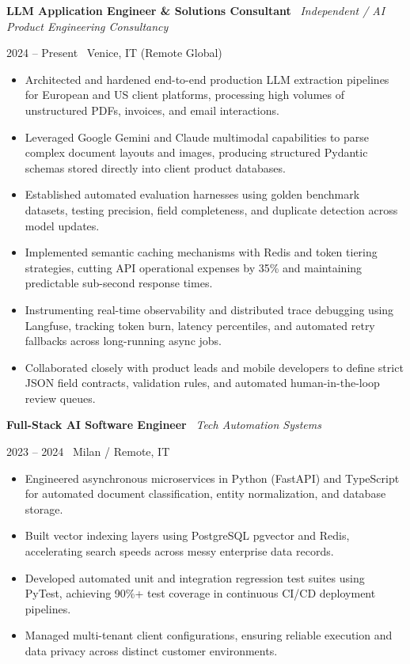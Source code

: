 \documentclass[a4paper,10pt]{article}
\newcommand{\role}[4]{%
  \vspace{2pt}\noindent
  \begin{minipage}[t]{0.70\textwidth}\raggedright\textbf{#1} \textbullet\ \textit{#3}\end{minipage}%
  \hfill
  \begin{minipage}[t]{0.28\textwidth}\raggedleft\footnotesize\color{gray}#2 \textbullet\ #4\end{minipage}%
  \vspace{1pt}%
}
\begin{document}
\role{LLM Application Engineer \& Solutions Consultant}{2024 -- Present}{Independent / AI Product Engineering Consultancy}{Venice, IT (Remote Global)}
\begin{itemize}
  \item Architected and hardened end-to-end production LLM extraction pipelines for European and US client platforms, processing high volumes of unstructured PDFs, invoices, and email interactions.
  \item Leveraged Google Gemini and Claude multimodal capabilities to parse complex document layouts and images, producing structured Pydantic schemas stored directly into client product databases.
  \item Established automated evaluation harnesses using golden benchmark datasets, testing precision, field completeness, and duplicate detection across model updates.
  \item Implemented semantic caching mechanisms with Redis and token tiering strategies, cutting API operational expenses by 35\% and maintaining predictable sub-second response times.
  \item Instrumenting real-time observability and distributed trace debugging using Langfuse, tracking token burn, latency percentiles, and automated retry fallbacks across long-running async jobs.
  \item Collaborated closely with product leads and mobile developers to define strict JSON field contracts, validation rules, and automated human-in-the-loop review queues.
\end{itemize}

\vspace{3pt}
\role{Full-Stack AI Software Engineer}{2023 -- 2024}{Tech Automation Systems}{Milan / Remote, IT}
\begin{itemize}
  \item Engineered asynchronous microservices in Python (FastAPI) and TypeScript for automated document classification, entity normalization, and database storage.
  \item Built vector indexing layers using PostgreSQL pgvector and Redis, accelerating search speeds across messy enterprise data records.
  \item Developed automated unit and integration regression test suites using PyTest, achieving 90\%+ test coverage in continuous CI/CD deployment pipelines.
  \item Managed multi-tenant client configurations, ensuring reliable execution and data privacy across distinct customer environments.
\end{itemize}
\end{document}
